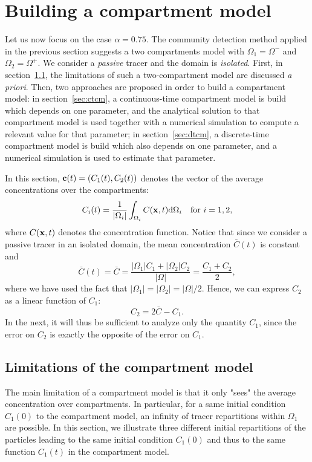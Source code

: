 \section{Building a compartment model}
Let us now focus on the case $\alpha = 0.75$. The community detection method applied in the previous section suggests a two compartments model with $\Omega_1 = \Omega^-$ and $\Omega_2 = \Omega^+$. We consider a \textit{passive} tracer and the domain is \textit{isolated}. First, in section~\ref{subsec:limitations}, the limitations of such a two-compartment model are discussed \textit{a priori}. Then, two approaches are proposed in order to build a compartment model: in section~\ref{sec:ctcm}, a continuous-time compartment model is build which depends on one parameter, and the analytical solution to that compartment model is used together with a numerical simulation to compute a relevant value for that parameter; in section~\ref{sec:dtcm}, a discrete-time compartment model is build which also depends on one parameter, and a numerical simulation is used to estimate that parameter.  

In this section, $\mathbf c(t) = (C_1(t),C_2(t))$ denotes the vector of the average concentrations over the compartments:
\begin{equation}
	C_i(t) = \frac{1}{|\Omega_i|} \int_{\Omega_i} C(\mathbf x,t) \mathrm d\Omega_i \quad \mbox{for } i = 1,2,
\end{equation}
where $C(\mathbf x,t)$ denotes the concentration function. Notice that since we consider a passive tracer in an isolated domain, the mean concentration $\bar C(t)$ is constant and
\begin{equation}
	\bar C(t) = \bar C = \frac{|\Omega_1| C_1 + |\Omega_2| C_2}{|\Omega|} = \frac{C_1 + C_2}{2},
\end{equation}
where we have used the fact that $|\Omega_1| = |\Omega_2| = |\Omega|/2$. Hence, we can express $C_2$ as a linear function of $C_1$:
\begin{equation} \label{eq:C2-C1}
	C_2 = 2\bar C - C_1.
\end{equation}
In the next, it will thus be sufficient to analyze only the quantity $C_1$, since the error on $C_2$ is exactly the opposite of the error on $C_1$.


\subsection{Limitations of the compartment model} \label{subsec:limitations}
The main limitation of a compartment model is that it only "sees" the average concentration over compartments. In particular, for a same initial condition $C_1(0)$ to the compartment model, an infinity of tracer repartitions within $\Omega_1$ are possible. In this section, we illustrate three different initial repartitions of the particles leading to the same initial condition $C_1(0)$ and thus to the same function $C_1(t)$ in the compartment model.

